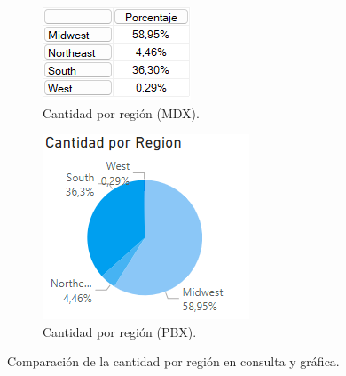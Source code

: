 \documentclass{article}
\begin{document}
\begin{figure}[H]
	\centering
	\begin{subfigure}[b]{0.4\textwidth}
		\centering
		\includegraphics[width=\textwidth]{images/cantidad_region_mdx.png}
		\caption{Cantidad por región (MDX).}
		\label{fig:region_mdx}
	\end{subfigure}
	\hfill
	\begin{subfigure}[b]{0.4\textwidth}
		\centering
		\includegraphics[width=\textwidth]{images/cantidad_region_pbx.png}
		\caption{Cantidad por región (PBX).}
		\label{fig:region_pbx}
	\end{subfigure}
	\caption{Comparación de la cantidad por región en consulta y gráfica.}
	\label{fig:region_comparacion}
\end{figure}
\end{document}
